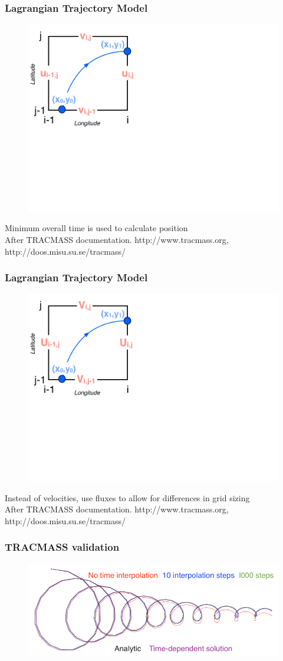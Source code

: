 \documentclass[ignorenonframetext]{beamer}
\begin{document}
\begin{frame}[t,noframenumbering]\frametitle{Lagrangian Trajectory Model}
	\begin{figure}[htbp]
		\centering
		\includegraphics[width=.5\textwidth]{figures/tracmass_box10}
	\end{figure}
	{\Large Minimum overall time is used to calculate position}
	\tiny{\\After TRACMASS documentation. http://www.tracmass.org, http://doos.misu.su.se/tracmass/}
\end{frame}
\begin{frame}[t,noframenumbering]\frametitle{Lagrangian Trajectory Model}
	\begin{figure}[htbp]
		\centering
		\includegraphics[width=.5\textwidth]{figures/tracmass_box11}
	\end{figure}
	{\Large Instead of velocities, use fluxes to allow for differences in grid sizing}
	\tiny{\\After TRACMASS documentation. http://www.tracmass.org, http://doos.misu.su.se/tracmass/}
\end{frame}

\begin{frame}[t]\frametitle{TRACMASS validation}
	\begin{figure}[htbp]
		\centering
		\includegraphics[width=\textwidth]{figures/validation}
	\end{figure}
\end{frame}
\end{document}
